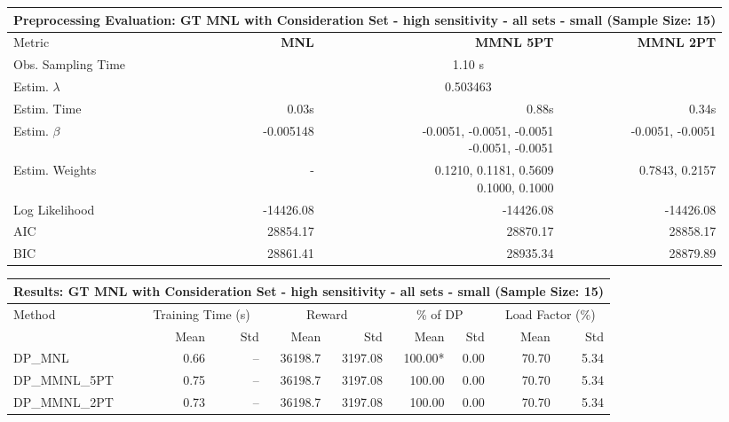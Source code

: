 
\begin{samepage}
\begin{center}
  \small
  \begin{tabular}{l|r|r|r}
    \toprule
    \multicolumn{4}{c}{\textbf{Preprocessing Evaluation: GT MNL with Consideration Set - high sensitivity - all sets - small (Sample Size: 15)}} \\
    \midrule
    Metric & \textbf{MNL} & \textbf{MMNL 5PT} & \textbf{MMNL 2PT} \\
    \midrule
    Obs. Sampling Time & \multicolumn{3}{c}{1.10 s} \\
    Estim. $\lambda$ & \multicolumn{3}{c}{0.503463} \\
    Estim. Time & 0.03s & 0.88s & 0.34s \\
    Estim. $\beta$ & -0.005148 & \makecell[tr]{-0.0051, -0.0051, -0.0051 \\ -0.0051, -0.0051} & -0.0051, -0.0051 \\
    Estim. Weights & - & \makecell[tr]{0.1210, 0.1181, 0.5609 \\ 0.1000, 0.1000} & 0.7843, 0.2157 \\
    Log Likelihood & -14426.08 & -14426.08 & -14426.08 \\
    AIC & 28854.17 & 28870.17 & 28858.17 \\
    BIC & 28861.41 & 28935.34 & 28879.89 \\
    \bottomrule
  \end{tabular}
\end{center}
\begin{center}
  \small
  \begin{tabular}{l|rr|rr|rr|rr}
    \toprule
    \multicolumn{9}{c}{\textbf{Results: GT MNL with Consideration Set - high sensitivity - all sets - small (Sample Size: 15)}} \\
    \midrule
    Method & \multicolumn{2}{c|}{Training Time (s)} & \multicolumn{2}{c|}{Reward} & \multicolumn{2}{c|}{\% of DP} & \multicolumn{2}{c}{Load Factor (\%)} \\
    & Mean & Std & Mean & Std & Mean & Std & Mean & Std \\
    \midrule
    DP\_MNL      &     0.66 &    -- &    36198.7 &    3197.08 & 100.00* &    0.00 &   70.70 &    5.34 \\
    DP\_MMNL\_5PT &     0.75 &    -- &    36198.7 &    3197.08 &  100.00 &    0.00 &   70.70 &    5.34 \\
    DP\_MMNL\_2PT &     0.73 &    -- &    36198.7 &    3197.08 &  100.00 &    0.00 &   70.70 &    5.34 \\

\end{tabular}
\end{center}
\end{samepage}
